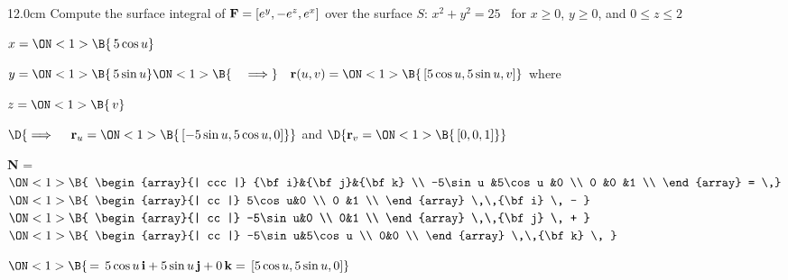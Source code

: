 \begin{frame}
\begin{columns}\begin{column}{12.0cm}
\scriptsize
\EX Compute the surface integral of ${\bf F} = [e^y, -e^z, e^x]$ over the surface $S:\, x^2 + y^2 = 25$ \, for $x \ge 0$, $y \ge 0$, and $0 \le z \le 2$

\vspace{0.2cm}

\quad $
x =
\ON<1>{\B{\,5 \cos u}}$

\quad $
y =
\ON<1>{\B{\,5 \sin u}}
\ON<1>{\B{\quad \implies}} \quad {\bf r}(u,v) =
\ON<1>{\B{\, [5\cos u,5 \sin u,v]}}$ \qquad where \quad
{}

\quad $
z =
\ON<1>{\B{\,v}}$

\vspace{0.2cm}
\hspace{1.3cm} $\D{
\implies \quad {\bf r}_u =
\ON<1>{\B{\, [-5\sin u,5\cos u,0]}}}$ \qquad 
and
\qquad $\D{
{\bf r}_v = 
\ON<1>{\B{\,[0,0,1]}}}$

\vspace{0.3cm}

{\bf N} = \,
$\ON<1>{\B{
\begin{array}{| ccc |}
	{\bf i}&{\bf j}&{\bf k} \\
	-5\sin u      &5\cos u     &0 \\
 	0      &0      &1 \\
\end{array}
= \,}}$
$\ON<1>{\B{
\begin{array}{| cc |}
		  5\cos u&0 \\
 		  0 &1 \\
\end{array}
 \,\,{\bf i} \, - }}$\,\,
$\ON<1>{\B{
\begin{array}{| cc |}
		  -5\sin u&0 \\
 		  0&1 \\
\end{array}
 \,\,{\bf j} \, + }}$\,\,
$\ON<1>{\B{
\begin{array}{| cc |}
		  -5\sin u&5\cos u \\
 		  0&0 \\
\end{array}
\,\,{\bf k} \, }}$\\

\vspace{0.3cm}

\hspace{3.65cm} $\ON<1>{\B{\, = \, 5\cos u \,{\bf i} + 5\sin u\,{\bf j} + 0\,{\bf k} = \, [5\cos u,5\sin u,0]}}$


\end{column}
\end{columns}
\end{frame}
